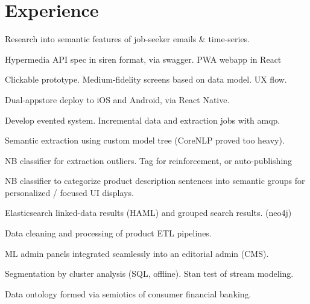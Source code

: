 \documentclass[letterpaper]{deedy-resume} %
\begin{document}
\begin{minipage}[t]{0.66\textwidth} %


\section{Experience}



\vspace{\topsep} %
\begin{tightitemize}
\item Research into semantic features of job-seeker emails \& time-series.
\item Hypermedia API spec in siren format, via swagger. PWA webapp in React
\item Clickable prototype. Medium-fidelity screens based on data model. UX flow.
\item Dual-appstore deploy to iOS and Android, via React Native.
\item Develop evented system. Incremental data and extraction jobs with amqp.
\end{tightitemize}

\sectionspace %



\begin{tightitemize}
\item Semantic extraction using custom model tree (CoreNLP proved too heavy).
\item NB classifier for extraction outliers. Tag for reinforcement, or auto-publishing
\item NB classifier to categorize product description sentences into semantic groups for personalized / focused UI displays. 
\item Elasticsearch linked-data results (HAML) and grouped search results. (neo4j)
\item Data cleaning and processing of product ETL pipelines.
\item ML admin panels integrated seamlessly into an editorial admin (CMS).
\item Segmentation by cluster analysis (SQL, offline).  Stan test of stream modeling.
\item Data ontology formed via semiotics of consumer financial banking.


\end{tightitemize}
\end{minipage}
\end{document}
